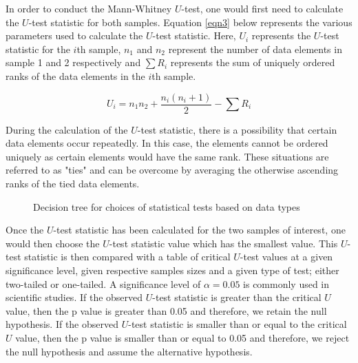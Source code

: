 \justify
In order to conduct the Mann-Whitney $U$-test, one would first need to calculate the $U$-test statistic for both samples. Equation \ref{eqn3} below represents the various parameters used to calculate the $U$-test statistic. Here, $U_i$ represents the $U$-test statistic for the $i$th sample, $n_1$ and $n_2$ represent the number of data elements in sample 1 and 2 respectively and $\sum R_i$ represents the sum of uniquely ordered ranks of the data elements in the $i$th sample. 

\begin{equation}
\label{eqn3}
U_i = n_1n_2 + \dfrac{n_i(n_i+1)}{2} - \sum R_i
\end{equation}

\justify
During the calculation of the $U$-test statistic, there is a possibility that certain data elements occur repeatedly. In this case, the elements cannot be ordered uniquely as certain elements would have the same rank. These situations are referred to as "ties" and can be overcome by averaging the otherwise ascending ranks of the tied data elements.

\begin{figure}[H]
	\centering
	{
		\setlength{\fboxsep}{10pt}%
		\setlength{\fboxrule}{0pt}%
	}
	\caption{Decision tree for choices of statistical tests based on data types \citep{nayak2011}}\label{fig18}
\end{figure}


\justify
Once the $U$-test statistic has been calculated for the two samples of interest, one would then choose the $U$-test statistic value which has the smallest value. This $U$-test statistic is then compared with a table of critical $U$-test values at a given significance level, given respective samples sizes and a given type of test; either two-tailed or one-tailed. A significance level of $\alpha=0.05$ is commonly used in scientific studies. If the observed $U$-test statistic is greater than the critical $U$ value, then the p value is greater than 0.05 and therefore, we retain the null hypothesis. If the observed $U$-test statistic is smaller than or equal to the critical $U$ value, then the p value is smaller than or equal to 0.05 and therefore, we reject the null hypothesis and assume the alternative hypothesis.


